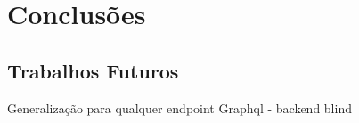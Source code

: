 \chapter{Conclusões}
\label{chap7}
 \section{Trabalhos Futuros}
 
Generalização para qualquer endpoint Graphql - backend blind